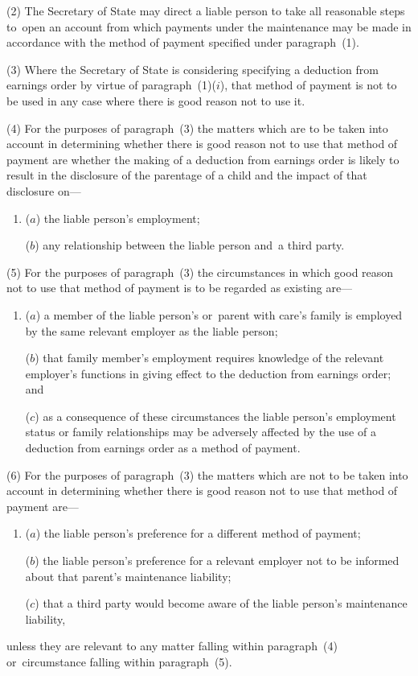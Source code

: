 \documentclass[12pt,a4paper]{article}
\begin{document}
(2) The Secretary of State may direct a liable person to take all reasonable steps to~open an account from which payments under the maintenance 
may be made in accordance with the method of payment specified under paragraph~(1).

(3) Where the Secretary of State is considering specifying a deduction from earnings order by virtue of paragraph~(1)($i$), that method of payment is not to be used in any case where there is good reason not to use it.

(4) For the purposes of paragraph~(3) the matters which are to be taken into account in determining whether there is good reason not to use that method of payment are whether the making of a deduction from earnings order is likely to result in the disclosure of the parentage of a child and the impact of that disclosure on—
\begin{enumerate}\item[]
($a$) the liable person’s employment;

($b$) any relationship between the liable person and~a third party.
\end{enumerate}

(5) For the purposes of paragraph~(3) the circumstances in which good reason not to use that method of payment is to be regarded as existing are—
\begin{enumerate}\item[]
($a$) a member of the liable person’s or~parent with care’s family is employed by the same relevant employer as the liable person;

($b$) that family member’s employment requires knowledge of the relevant employer’s functions in giving effect to the deduction from earnings order; and

($c$) as a consequence of these circumstances the liable person’s employment status or family relationships may be adversely affected by the use of a deduction from earnings order as a method of payment.
\end{enumerate}

(6) For the purposes of paragraph~(3) the matters which are not to be taken into account in determining whether there is good reason not to use that method of payment are—
\begin{enumerate}\item[]
($a$) the liable person’s preference for a different method of payment;

($b$) the liable person’s preference for a relevant employer not to be informed about that parent’s maintenance liability;

($c$) that a third party would become aware of the liable person’s maintenance liability,
\end{enumerate}
unless they are relevant to any matter falling within paragraph~(4) or~circumstance falling within paragraph~(5).
\end{document}
